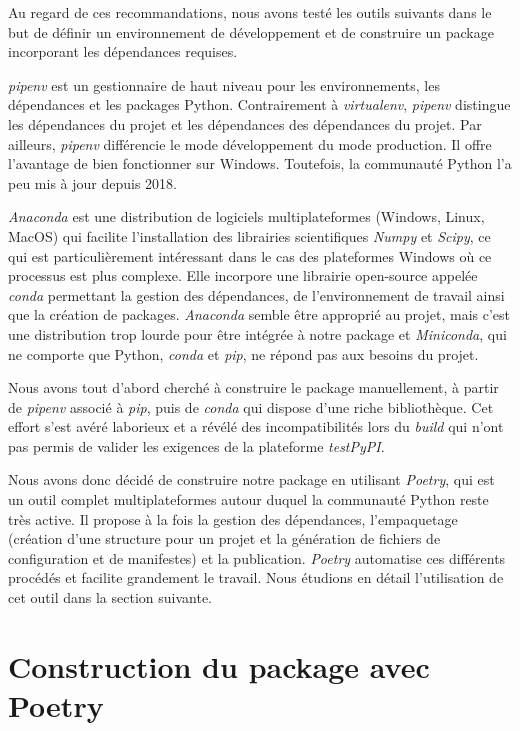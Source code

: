 \documentclass[twoside,a4paper,11pt,frenchb,openany]{report}
\begin{document}
Au regard de ces recommandations, nous avons testé les outils suivants dans le but de définir un environnement de développement et de construire un package incorporant les dépendances requises.

\textit{pipenv} est un gestionnaire de haut niveau pour les environnements, les dépendances et les packages Python. Contrairement à \textit{virtualenv}, \textit{pipenv} distingue les dépendances du projet et les dépendances des dépendances du projet. Par ailleurs, \textit{pipenv} différencie le mode développement du mode production. Il offre l'avantage de bien fonctionner sur Windows. Toutefois, la communauté Python l'a peu mis à jour depuis 2018.

\textit{Anaconda} est une distribution de logiciels multiplateformes (Windows, Linux, MacOS) qui facilite l'installation des librairies scientifiques \textit{Numpy} et \textit{Scipy}, ce qui est particulièrement intéressant dans le cas des plateformes Windows où ce processus est plus complexe. Elle incorpore une librairie open-source appelée \textit{conda} permettant la gestion des dépendances, de l'environnement de travail ainsi que la création de packages. \textit{Anaconda} semble être approprié au projet, mais c'est une distribution trop lourde pour être intégrée à notre package et \textit{Miniconda}, qui ne comporte que Python, \textit{conda} et \textit{pip}, ne répond pas aux besoins du projet.

Nous avons tout d'abord cherché à construire le package manuellement, à partir de \textit{pipenv} associé à \textit{pip}, puis de \textit{conda} qui dispose d'une riche bibliothèque. Cet effort s'est avéré laborieux et a révélé des incompatibilités lors du \textit{build} qui n'ont pas permis de valider les exigences de la plateforme \textit{testPyPI}.

Nous avons donc décidé de construire notre package en utilisant \textit{Poetry}, qui est un outil complet multiplateformes autour duquel la communauté Python reste très active. Il propose à la fois la gestion des dépendances, l'empaquetage (création d'une structure pour un projet et la génération de fichiers de configuration et de manifestes) et la publication. \textit{Poetry} automatise ces différents procédés et facilite grandement le travail. Nous étudions en détail l'utilisation de cet outil dans la section suivante.
	


\chapter{Construction du package avec Poetry}
\end{document}
